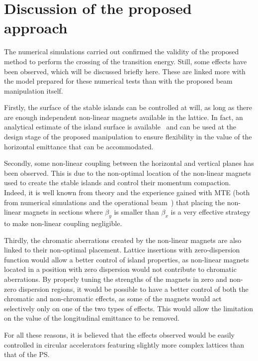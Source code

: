 \documentclass{article}
\begin{document}
\section{Discussion of the proposed approach}\label{sec:discussion}
%
The numerical simulations carried out confirmed the validity of the proposed method to perform the crossing of the transition energy. Still, some effects have been observed, which will be discussed briefly here. These are linked more with the model prepared for these numerical tests than with the proposed beam manipulation itself. 

Firstly, the surface of the stable islands can be controlled at will, as long as there are enough independent non-linear magnets available in the lattice. In fact, an analytical estimate of the island surface is available~\cite{giallo} and can be used at the design stage of the proposed manipulation to ensure flexibility in the value of the horizontal emittance that can be accommodated. 

Secondly, some non-linear coupling between the horizontal and vertical planes has been observed. This is due to the non-optimal location of the non-linear magnets used to create the stable islands and control their momentum compaction. Indeed, it is well known from theory and the experience gained with MTE (both from numerical simulations and the operational beam~\cite{MTEope1,MTEope2}) that placing the non-linear magnets in sections where $\beta_{y}$ is smaller than $\beta_{x}$ is a very effective strategy to make non-linear coupling negligible. 

Thirdly, the chromatic aberrations created by the non-linear magnets are also linked to their non-optimal placement. Lattice insertions with zero-dispersion function would allow a better control of island properties, as non-linear magnets located in a position with zero dispersion would not contribute to chromatic aberrations. By properly tuning the strengths of the magnets in zero and non-zero dispersion regions, it would be possible to have a better control of both the chromatic and non-chromatic effects, as some of the magnets would act selectively only on one of the two types of effects. This would allow the limitation on the value of the longitudinal emittance to be removed.

For all these reasons, it is believed that the effects observed would be easily controlled in circular accelerators featuring slightly more complex lattices than that of the PS.
%
\end{document}
